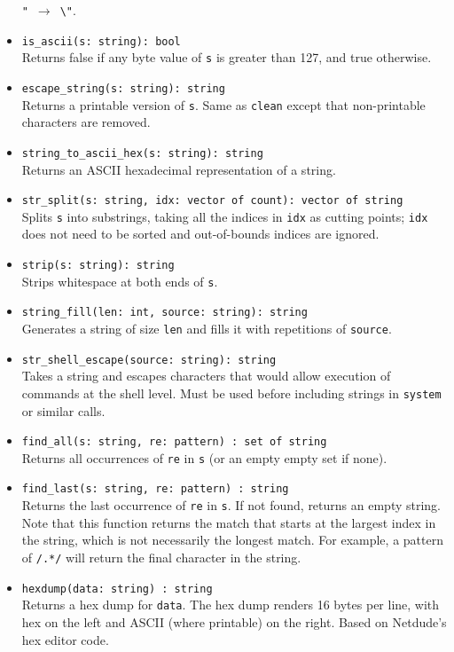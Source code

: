 \documentclass[10pt,landscape]{article}
\begin{document}
\begin{multicols*}{2}
\begin{itemize}
    \verb|"|~$\rightarrow$~\verb|\"|.
  \item \verb|is_ascii(s: string): bool|\\
    Returns false if any byte value of \texttt{s} is greater than 127, and true
    otherwise.
  \item \verb|escape_string(s: string): string|\\
    Returns a printable version of \texttt{s}. Same as \texttt{clean} except
    that non-printable characters are removed.
  \item \verb|string_to_ascii_hex(s: string): string|\\
    Returns an ASCII hexadecimal representation of a string.
  \item \verb|str_split(s: string, idx: vector of count): vector of string|\\
    Splits \texttt{s} into substrings, taking all the indices in
    \texttt{idx} as cutting points; \texttt{idx} does not need to be sorted and
    out-of-bounds indices are ignored.
  \item \verb|strip(s: string): string|\\
    Strips whitespace at both ends of \texttt{s}.
  \item \verb|string_fill(len: int, source: string): string|\\
    Generates a string of size \texttt{len} and fills it with repetitions of
    \texttt{source}.
  \item \verb|str_shell_escape(source: string): string|\\
    Takes a string and escapes characters that would allow execution of
    commands at the shell level. Must be used before including strings in
    \verb|system| or similar calls.
  \item \verb|find_all(s: string, re: pattern) : set of string|\\
    Returns all occurrences of \texttt{re} in \texttt{s} (or an empty empty set
    if none).
  \item \verb|find_last(s: string, re: pattern) : string|\\
    Returns the last occurrence of \texttt{re} in \texttt{s}. If not found,
    returns an empty string.  Note that this function returns the match that
    starts at the largest index in the string, which is not necessarily the
    longest match.  For example, a pattern of \texttt{/.*/} will return the
    final character in the string.
  \item \verb|hexdump(data: string) : string|\\
    Returns a hex dump for \texttt{data}. The hex dump renders 16 bytes per
    line, with hex on the left and ASCII (where printable) on the right. Based
    on Netdude's hex editor code.
\end{itemize}


\end{multicols*}
\end{document}
